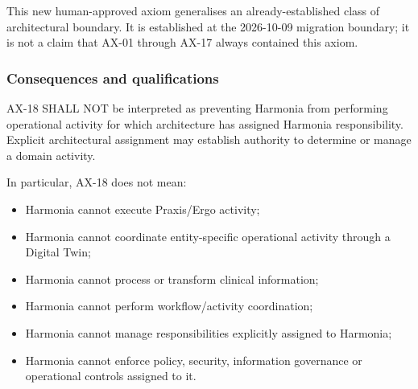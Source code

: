 \label{rad:axioms:893}

This new human-approved axiom generalises an already-established class of architectural boundary. It is established at the 2026-10-09 migration boundary; it is not a claim that AX-01 through AX-17 always contained this axiom.

\label{rad:axioms:898}
\subsubsection*{Consequences and qualifications}
\label{rad:axioms:900}

AX-18 SHALL NOT be interpreted as preventing Harmonia from performing operational activity for which architecture has assigned Harmonia responsibility. Explicit architectural assignment may establish authority to determine or manage a domain activity.

\label{rad:axioms:905}

In particular, AX-18 does not mean:

\label{rad:axioms:907}

\begin{itemize}

\item
Harmonia cannot execute Praxis/\allowbreak{}Ergo activity;



\item
Harmonia cannot coordinate entity-specific operational activity through a Digital Twin;



\item
Harmonia cannot process or transform clinical information;



\item
Harmonia cannot perform workflow/\allowbreak{}activity coordination;



\item
Harmonia cannot manage responsibilities explicitly assigned to Harmonia;



\item
Harmonia cannot enforce policy, security, information governance or operational controls assigned to it.



\end{itemize}
\label{rad:axioms:914}

